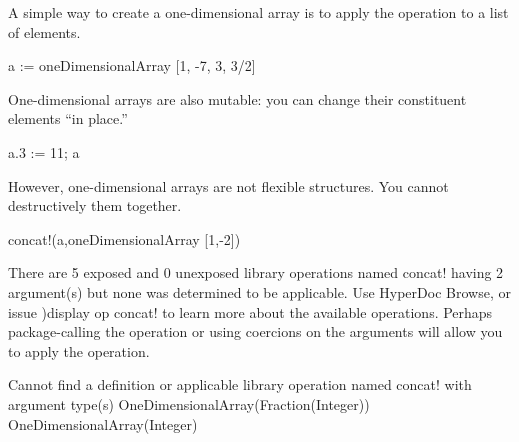 {{{{{{{{\begin{xtc}
\begin{xtccomment}
A simple way to create a one-dimensional array is to apply the
operation  to a list of elements.
\end{xtccomment}
\begin{spadsrc}
a := oneDimensionalArray [1, -7, 3, 3/2]
\end{spadsrc}
\begin{TeXOutput}
\begin{fricasmath}{8}
%
\end{fricasmath}
\end{TeXOutput}
\end{xtc}
\begin{xtc}
\begin{xtccomment}
One-dimensional arrays are also mutable:
you can change their constituent elements ``in place.''
\end{xtccomment}
\begin{spadsrc}
a.3 := 11; a
\end{spadsrc}
\begin{TeXOutput}
\begin{fricasmath}{9}
%
\end{fricasmath}
\end{TeXOutput}
\end{xtc}
\begin{xtc}
\begin{xtccomment}
However, one-dimensional arrays are not flexible structures.
You cannot destructively  them together.
\end{xtccomment}
\begin{spadsrc}
concat!(a,oneDimensionalArray [1,-2])
\end{spadsrc}
\begin{MessageOutput}
   There are 5 exposed and 0 unexposed library operations named concat!
      having 2 argument(s) but none was determined to be applicable. 
      Use HyperDoc Browse, or issue
                             )display op concat!
      to learn more about the available operations. Perhaps 
      package-calling the operation or using coercions on the arguments
      will allow you to apply the operation.
\end{MessageOutput}
\begin{MessageOutput}
   Cannot find a definition or applicable library operation named 
      concat! with argument type(s) 
                   OneDimensionalArray(Fraction(Integer))
                        OneDimensionalArray(Integer)
      

\end{MessageOutput}
\end{xtc}}}}}}}}}
